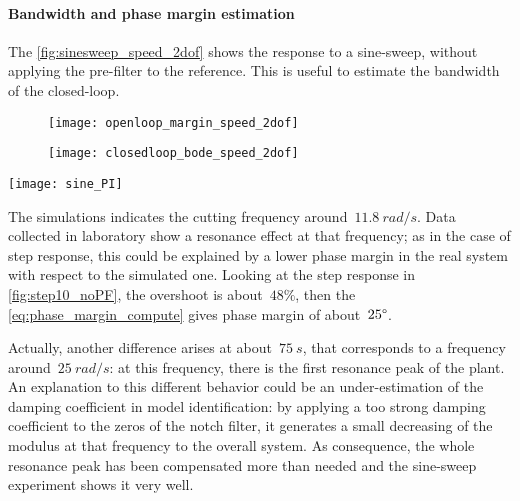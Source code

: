 \paragraph{Bandwidth and phase margin estimation}
The \cref{fig:sinesweep_speed_2dof} shows the response to a sine-sweep, without applying the pre-filter to the reference. This is useful to estimate the bandwidth of the closed-loop.
\begin{figure*}[h]
	\centering
	\begin{subfigure}{0.45\columnwidth}
		\texttt{[image: openloop\_margin\_speed\_2dof]}
	\end{subfigure}
	\begin{subfigure}{0.45\columnwidth}
		\texttt{[image: closedloop\_bode\_speed\_2dof]}
	\end{subfigure}
\end{figure*}
\begin{figure*}[h]
	\texttt{[image: sine\_PI]}
	\caption{Sine-sweep experiment from $1\ Hz$ to $10\ Hz$ in $100\ s$}
	\label{fig:sinesweep_speed_2dof}
\end{figure*}

The simulations indicates the cutting frequency around~$11.8\ rad/s$. Data collected in laboratory show a resonance effect at that frequency; as in the case of step response, this could be explained by a lower phase margin in the real system with respect to the simulated one.
Looking at the step response in \cref{fig:step10_noPF}, the overshoot is about~$48\%$, then the \cref{eq:phase_margin_compute} gives phase margin of about~$25\degree$.

Actually, another difference arises at about~$75\ s$, that corresponds to a frequency around~$25\ rad/s$: at this frequency, there is the first resonance peak of the plant. An explanation to this different behavior could be an under-estimation of the damping coefficient in model identification: by applying a too strong damping coefficient to the zeros of the notch filter, it generates a small decreasing of the modulus at that frequency to the overall system. As consequence, the whole resonance peak has been compensated more than needed and the sine-sweep experiment shows it very well. \\


